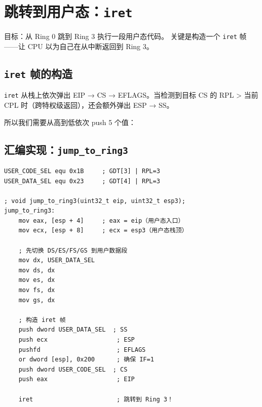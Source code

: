 \section{跳转到用户态：\texttt{iret}}
\label{sec:tss-iret}

目标：从 Ring 0 跳到 Ring 3 执行一段用户态代码。
关键是构造一个 \texttt{iret} 帧——让 CPU 以为自己在从中断返回到 Ring 3。

\subsection{\texttt{iret} 帧的构造}

\texttt{iret} 从栈上依次弹出 EIP → CS → EFLAGS。当检测到目标 CS 的 RPL > 当前 CPL 时（跨特权级返回），还会额外弹出 ESP → SS。

所以我们需要从高到低依次 push 5 个值：



\subsection{汇编实现：\texttt{jump\_to\_ring3}}

\begin{lstlisting}[style=nasmstyle]
USER_CODE_SEL equ 0x1B     ; GDT[3] | RPL=3
USER_DATA_SEL equ 0x23     ; GDT[4] | RPL=3

; void jump_to_ring3(uint32_t eip, uint32_t esp3);
jump_to_ring3:
    mov eax, [esp + 4]     ; eax = eip（用户态入口）
    mov ecx, [esp + 8]     ; ecx = esp3（用户态栈顶）

    ; 先切换 DS/ES/FS/GS 到用户数据段
    mov dx, USER_DATA_SEL
    mov ds, dx
    mov es, dx
    mov fs, dx
    mov gs, dx

    ; 构造 iret 帧
    push dword USER_DATA_SEL  ; SS
    push ecx                   ; ESP
    pushfd                     ; EFLAGS
    or dword [esp], 0x200      ; 确保 IF=1
    push dword USER_CODE_SEL  ; CS
    push eax                   ; EIP

    iret                       ; 跳转到 Ring 3！
\end{lstlisting}

